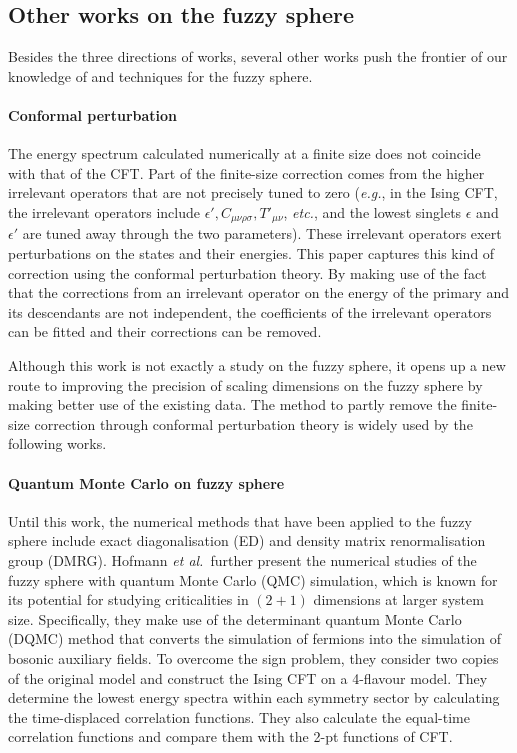 \documentclass{timesjhep}
\begin{document}
\subsection{Other works on the fuzzy sphere}

Besides the three directions of works, several other works push the frontier of our knowledge of and techniques for the fuzzy sphere.

\paragraph{Conformal perturbation~\cite{Lao2023}}

The energy spectrum calculated numerically at a finite size does not coincide with that of the CFT. Part of the finite-size correction comes from the higher irrelevant operators that are not precisely tuned to zero (\textit{e.g.}, in the Ising CFT, the irrelevant operators include $\epsilon', C_{\mu\nu\rho\sigma}, T'_{\mu\nu}$, \textit{etc.}, and the lowest singlets $\epsilon$ and $\epsilon'$ are tuned away through the two parameters). These irrelevant operators exert perturbations on the states and their energies. This paper captures this kind of correction using the conformal perturbation theory. By making use of the fact that the corrections from an irrelevant operator on the energy of the primary and its descendants are not independent, the coefficients of the irrelevant operators can be fitted and their corrections can be removed.

Although this work is not exactly a study on the fuzzy sphere, it opens up a new route to improving the precision of scaling dimensions on the fuzzy sphere by making better use of the existing data. The method to partly remove the finite-size correction through conformal perturbation theory is widely used by the following works.

\paragraph{Quantum Monte Carlo on fuzzy sphere~\cite{Hofmann2023}}

Until this work, the numerical methods that have been applied to the fuzzy sphere include exact diagonalisation (ED) and density matrix renormalisation group (DMRG). Hofmann \textit{et al.}~further present the numerical studies of the fuzzy sphere with quantum Monte Carlo (QMC) simulation, which is known for its potential for studying criticalities in $(2+1)$ dimensions at larger system size. Specifically, they make use of the determinant quantum Monte Carlo (DQMC) method that converts the simulation of fermions into the simulation of bosonic auxiliary fields. To overcome the sign problem, they consider two copies of the original model and construct the Ising CFT on a 4-flavour model. They determine the lowest energy spectra within each symmetry sector by calculating the time-displaced correlation functions. They also calculate the equal-time correlation functions and compare them with the 2-pt functions of CFT.
\end{document}
